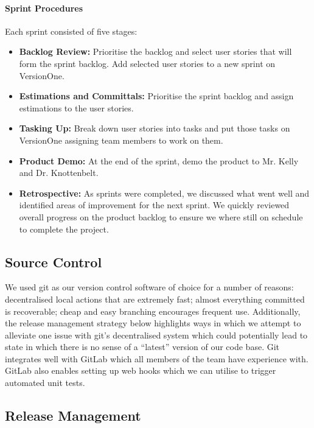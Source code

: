 \documentclass[a4paper,11pt]{article}
\begin{document}
\paragraph {Sprint Procedures}
Each sprint consisted of five stages:

\begin{itemize}
\item \textbf{Backlog Review:} Prioritise the backlog and select user stories that will form the sprint backlog. Add selected user stories to a new sprint on VersionOne.
\item \textbf{Estimations and Committals:} Prioritise the sprint backlog and assign estimations to the user stories. 
\item \textbf{Tasking Up:} Break down user stories into tasks and put those tasks on VersionOne assigning team members to work on them.
\item \textbf{Product Demo:} At the end of the sprint, demo the product to Mr. Kelly and Dr. Knottenbelt. 
\item \textbf{Retrospective:} As sprints were completed, we discussed what went well and identified areas of improvement for the next sprint. We quickly reviewed overall progress on the product backlog to ensure we where still on schedule to complete the project.

\end{itemize}


\subsection{Source Control}

We used git as our version control software of choice for a number of reasons: decentralised local actions that are extremely fast; almost everything committed is recoverable; cheap and easy branching encourages frequent use. Additionally, the release management strategy below highlights ways in which we attempt to alleviate one issue with git's decentralised system which could potentially lead to state in which there is no sense of a “latest” version of our code base. Git integrates well with GitLab which all members of the team have experience with. GitLab also enables setting up web hooks which we can utilise to trigger automated unit tests.

\subsection {Release Management}
\end{document}
